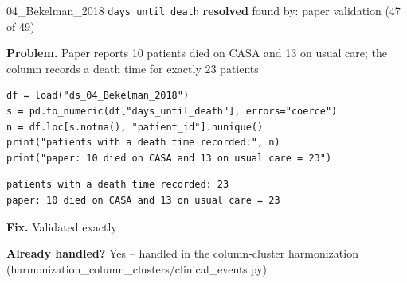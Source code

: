 \documentclass[9pt, t, handout]{beamer}
\newcommand{\ans}[1]{\textcolor{structure.fg}{#1}}
\begin{document}
\begin{frame}[fragile]{04\_Bekelman\_2018 \quad \texttt{days\_until\_death}}
  {\scriptsize\textcolor{green!45!black}{\textbf{resolved}} \quad
   found by: paper validation \quad (47 of 49)}
  \vspace{3pt}

  {\footnotesize \textbf{Problem.} Paper reports 10 patients died on CASA and 13 on usual care; the column records a death time for exactly 23 patients}
  \vspace{4pt}

  \begin{Verbatim}[fontsize=\tiny, frame=single, framesep=2pt, label=\tiny reproduce]
df = load("ds_04_Bekelman_2018")
s = pd.to_numeric(df["days_until_death"], errors="coerce")
n = df.loc[s.notna(), "patient_id"].nunique()
print("patients with a death time recorded:", n)
print("paper: 10 died on CASA and 13 on usual care = 23")
  \end{Verbatim}
  \begin{Verbatim}[fontsize=\tiny, frame=single, framesep=2pt, label=\tiny output]
patients with a death time recorded: 23
paper: 10 died on CASA and 13 on usual care = 23
  \end{Verbatim}
  \vspace{2pt}

  {\footnotesize \textbf{Fix.} Validated exactly}
  \vspace{2pt}

  {\footnotesize \textbf{Already handled?} \ans{Yes} -- handled in the column-cluster harmonization
   (harmonization\_column\_clusters/clinical\_events.py)}
\end{frame}
\end{document}
